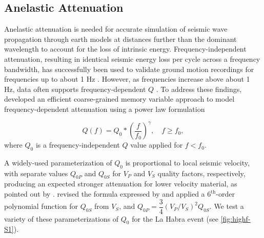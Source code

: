 \subsection{Anelastic Attenuation}
Anelastic attenuation is needed for accurate simulation of seismic wave propagation through earth models at distances further than the dominant wavelength to account for the loss of intrinsic energy. Frequency-independent attenuation, resulting in identical seismic energy loss per cycle across a frequency bandwidth, has successfully been used to validate ground motion recordings for frequencies up to about 1 Hz . However, as frequencies increase above about 1 Hz, data often supports frequency-dependent $Q$ . To address these findings, \citet{withersMemoryEfficientSimulation2015} developed an efficient coarse-grained memory variable approach to model frequency-dependent attenuation using a power law formulation

\begin{equation}\label{eq:highf-3}
  Q(f)=Q_{0} *\left(\dfrac{f}{f_{0}}\right)^{\gamma}, \quad f \geq f_{0},
\end{equation}
\noindent where $Q_0$ is a frequency-independent $Q$ value applied for $f<f_{0}$.  %

A widely-used parameterization of $Q_0$ is proportional to local seismic velocity, with separate values $Q_{0P}$ and $Q_{0S}$ for $V_P$ and $V_S$ quality factors, respectively, producing an expected stronger attenuation for lower velocity material, as pointed out by \citet{haukssonAttenuationModelsThree2006}. \citet{taborda2014ground} revised the formula expressed by \citet{brocher2008compressional} and applied a $6^{\text{th}}$-order polynomial function for $Q_{0S}$ from $V_S$, and $Q_{0P}=\dfrac{3}{4}\left(V_P/V_S\right)^2Q_{0S}$. We test a variety of these parameterizations of $Q_0$ for the La Habra event (see \cref{fig:highf-S1}).

